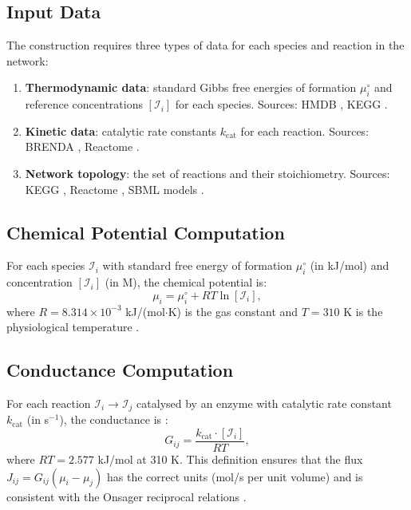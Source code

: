 \documentclass[11pt,twocolumn]{article}
\theoremstyle{plain}
\theoremstyle{definition}
\begin{document}
\subsection{Input Data}

The construction requires three types of data for each species and reaction in
the network:

\begin{enumerate}[label=(\alph*)]
\item \textbf{Thermodynamic data}: standard Gibbs free energies of formation
  $\mu_i^\circ$ and reference concentrations $[\mathcal{I}_i]$ for each species.
  Sources: HMDB \cite{wishart2018hmdb}, KEGG \cite{kanehisa2000kegg}.

\item \textbf{Kinetic data}: catalytic rate constants $k_{\text{cat}}$ for each
  reaction. Sources: BRENDA \cite{schomburg2004brenda}, Reactome
  \cite{jassal2020reactome}.

\item \textbf{Network topology}: the set of reactions and their stoichiometry.
  Sources: KEGG \cite{kanehisa2000kegg}, Reactome \cite{jassal2020reactome},
  SBML models \cite{hucka2003sbml}.
\end{enumerate}

\subsection{Chemical Potential Computation}

For each species $\mathcal{I}_i$ with standard free energy of formation
$\mu_i^\circ$ (in kJ/mol) and concentration $[\mathcal{I}_i]$ (in M), the
chemical potential is:
\begin{equation}\label{eq:mu}
  \mu_i = \mu_i^\circ + RT \ln[\mathcal{I}_i],
\end{equation}
where $R = 8.314 \times 10^{-3}$ kJ/(mol$\cdot$K) is the gas constant and
$T = 310$ K is the physiological temperature \cite{atkins2014physical,
alberty2003thermodynamics}.

\subsection{Conductance Computation}

For each reaction $\mathcal{I}_i \to \mathcal{I}_j$ catalysed by an enzyme with
catalytic rate constant $k_{\text{cat}}$ (in s$^{-1}$), the conductance is
\cite{beard2002energy, noor2014pathway}:
\begin{equation}\label{eq:G}
  G_{ij} = \frac{k_{\text{cat}} \cdot [\mathcal{I}_i]}{RT},
\end{equation}
where $RT = 2.577$ kJ/mol at 310 K. This definition ensures that the flux
$J_{ij} = G_{ij}(\mu_i - \mu_j)$ has the correct units (mol/s per unit
volume) and is consistent with the Onsager reciprocal relations
\cite{onsager1931reciprocal}.
\end{document}
